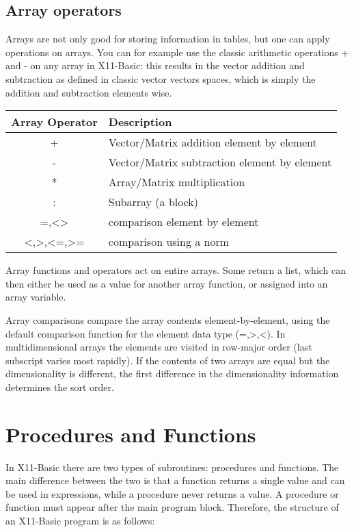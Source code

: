 \subsection*{Array operators}

Arrays are not only good for storing information in tables, but one can apply
operations on arrays. You can for example use the classic arithmetic operations
+ and - on any array in X11-Basic: this results in the vector addition and
subtraction as defined in classic vector vectors spaces, which is simply the
addition and subtraction elements wise.

\begin{center}
\begin{longtable}{|c|l|}
\hline
{\bf Array Operator} & {\bf Description} \\
\hline
+ & Vector/Matrix addition element by element \\
- & Vector/Matrix subtraction element by element \\
* & Array/Matrix multiplication \\
: & Subarray (a block) \\
=,<> & comparison  element by element \\
<,>,<=,>= & comparison using a norm \\
\hline
\end{longtable}
\end{center}


Array functions and operators act on entire arrays. Some return a list, which
can then either be used as a value for another array function, or assigned into
an array variable.

Array comparisons compare the array contents element-by-element, using the
default comparison function for the element data type (=,>,<). In
multidimensional arrays the elements are visited in row-major order (last
subscript varies most rapidly). If the contents of two arrays are equal but the
dimensionality is different, the first difference in the dimensionality
information determines the sort order. 

\section{Procedures and Functions}

In X11-Basic there are two types of subroutines: procedures and functions.
The main difference between the two is that a function returns a single
value and can be used in expressions, while a procedure never returns a
value. A procedure or function must appear after the main program block.
Therefore, the structure of an X11-Basic program is as follows:

